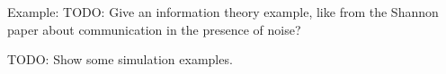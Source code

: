 \documentclass{book}
\newcommand{\dx}{\, dx}
\begin{document}
 Example: TODO: Give an information theory example, like from the Shannon paper about communication in the presence of noise?

TODO: Show some simulation examples. 


\end{document}

